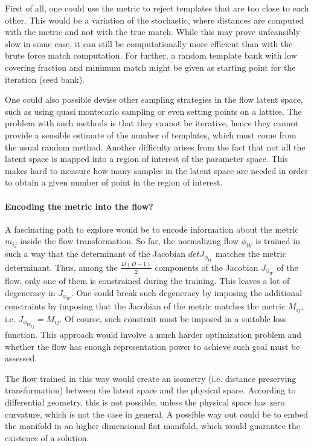 \documentclass[twocolumn,showpacs,preprintnumbers,nofootinbib,prd,
superscriptaddress,10pt]{revtex4-2}
\begin{document}
First of all, one could use the metric to reject templates that are too close to each other. This would be a variation of the stochastic, where distances are computed with the metric and not with the true match. While this may prove unfeansibly slow in some case, it can still be computationally more efficient than with the brute force match computation. For further, a random template bank with low covering fraction and minimum match might be given as starting point for the iteration (seed bank).

One could also possible devise other sampling strategies in the flow latent space, such as using quasi montecarlo sampling or even setting points on a lattice.
The problem with such methods is that they cannot be iterative, hence they cannot provide a sensible estimate of the number of templates, which must come from the usual random method. Another difficulty arises from the fact that not all the latent space is mapped into a region of interest of the parameter space. This makes hard to measure how many samples in the latent space are needed in order to obtain a given number of point in the region of interest.

\paragraph{Encoding the metric into the flow?}

A fascinating path to explore would be to encode information about the metric $m_{ij}$ inside the flow transformation.
So far, the normalizing flow $\phi_W$ is trained in such a way that the determinant of the Jacobian $det J_{\phi_W}$ matches the metric determinant.
Thus, among the $\frac{D(D-1)}{2}$ components of the Jacobian $J_{\phi_W}$ of the flow, only one of them is constrained during the training. This leaves a lot of degeneracy in $J_{\phi_W}$.
One could break such degeneracy by imposing the additional constraints by imposing that the Jacobian of the metric matches the metric $M_{ij}$, i.e. $J_{\phi_W}_{ij} = M_{ij}$.
Of course, such constrait must be imposed in a suitable loss function.
This approach would involve a much harder optimization problem and whether the flow has enough representation power to achieve such goal must be assessed.

The flow trained in this way would create an isometry (i.e. distance preserving transformation) between the latent space and the physical space. According to differential geometry, this is not possible, unless the physical space has zero curvature, which is not the case in general. A possible way out could be to embed the manifold in an higher dimensional flat manifold, which would guarantee the existence of a solution.
\end{document}
